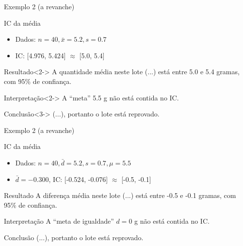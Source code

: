\documentclass{beamer}
\begin{document}
\begin{frame}{Exemplo 2 (a revanche)}
  \begin{exampleblock}{IC da média}
    \begin{itemize}
      \scriptsize
    \item Dados: $n=40, \bar{x} = 5.2, s = 0.7$
    \item IC: [4.976, 5.424] $\approx$ [5.0, 5.4]
    \end{itemize}
  \end{exampleblock}
  \begin{exampleblock}{Resultado}<2->
    \footnotesize
    A quantidade média neste lote (...)
    está entre 5.0 e 5.4 gramas, com 95\% de confiança.
  \end{exampleblock}
  \begin{block}{Interpretação}<2->
    \footnotesize
    A ``meta'' 5.5 g não está contida no IC.
  \end{block}
  \begin{exampleblock}{Conclusão}<3->
    (...), portanto o lote está reprovado.
  \end{exampleblock}
\end{frame}

\begin{frame}{Exemplo 2 (a revanche)}
  \begin{exampleblock}{IC da média}
    \begin{itemize}
      \scriptsize
    \item Dados: $n=40, \bar{d} = 5.2, s = 0.7, \mu = 5.5$
    \item $\bar{d} = -0.300$, IC: [-0.524, -0.076] $\approx$ [-0.5, -0.1]
    \end{itemize}
  \end{exampleblock}
  \begin{exampleblock}{Resultado}
    \footnotesize
    A diferença média neste lote (...)
    está entre -0.5 e -0.1 gramas, com 95\% de confiança.
  \end{exampleblock}
  \begin{block}{Interpretação}
    \footnotesize
    A ``meta de igualdade'' $d = 0$ g não está contida no IC.
  \end{block}
  \begin{exampleblock}{Conclusão}
    (...), portanto o lote está reprovado.
  \end{exampleblock}
\end{frame}
\end{document}
